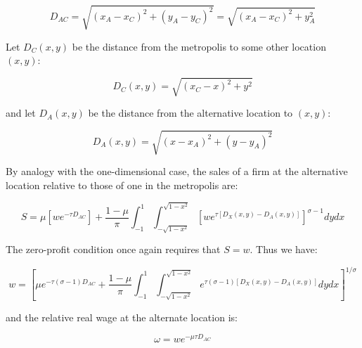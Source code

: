 \begin{equation}
    D_{AC} = \sqrt{(x_A - x_C)^2 + (y_A - y_C)^2} = \sqrt{(x_A - x_C)^2 + y_A^2}
\end{equation}

Let $D_C(x, y)$ be the distance from the metropolis to some other location $(x, y)$:

\begin{equation}
    D_C(x, y) = \sqrt{(x_C - x)^2 + y^2}
\end{equation}

and let $D_A(x, y)$ be the distance from the alternative location to $(x, y)$:

\begin{equation}
    D_A(x, y) = \sqrt{(x - x_A)^2 + (y - y_A)^2}
\end{equation}

By analogy with the one-dimensional case, the sales of a firm at the alternative location relative to those of one in the metropolis are:

\begin{equation}
    S = \mu[w e^{-\tau D_{AC}}] + \frac{1 - \mu}{\pi} \int_{-1}^1 \int_{-\sqrt{1 - x^2}}^{\sqrt{1 - x^2}} [w e^{\tau [D_X(x, y) - D_A(x, y)]}]^{\sigma - 1} dy dx
\end{equation}

The zero-profit condition once again requires that $S = w$. Thus we have:

\begin{equation}
    w = [\mu e^{-\tau(\sigma - 1) D_{AC}} + \frac{1 - \mu}{\pi} \int_{-1}^1 \int_{-\sqrt{1 - x^2}}^{\sqrt{1 - x^2}} e^{\tau(\sigma - 1) [D_X(x, y) - D_A(x, y)]} dy dx]^{1 / \sigma}
\end{equation}

and the relative real wage at the alternate location is:

\begin{equation}
    \omega = w e^{-\mu \tau D_{AC}}
\end{equation}